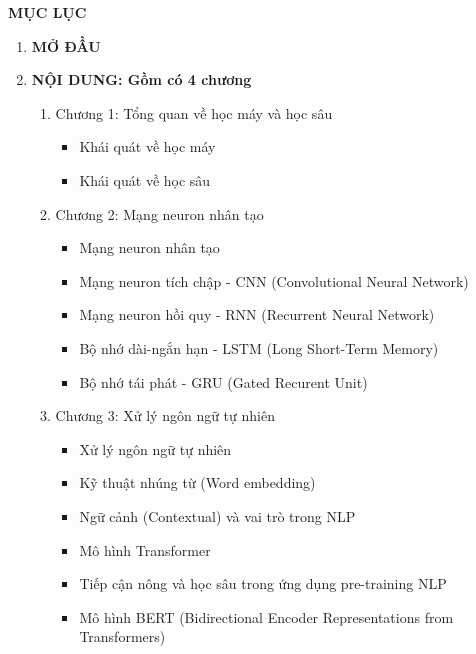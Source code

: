 
\begin{center}
    \textbf{MỤC LỤC}
\end{center}
\begin{enumerate}[label=\textbf{\arabic*.}]
    \item \textbf{MỞ ĐẦU}
    \item \textbf{NỘI DUNG: Gồm có 4 chương}
          \begin{enumerate}
              \item Chương 1: Tổng quan về học máy và học sâu
                    \begin{itemize}
                        \itemsep 0pt
                        \item Khái quát về học máy
                        \item Khái quát về học sâu
                    \end{itemize}
              \item Chương 2: Mạng neuron nhân tạo
                    \begin{itemize}
                        \item Mạng neuron nhân tạo
                        \item Mạng neuron tích chập - CNN (Convolutional Neural Network)
                        \item Mạng neuron hồi quy - RNN (Recurrent Neural Network)
                        \item Bộ nhớ dài-ngắn hạn - LSTM (Long Short-Term Memory)
                        \item Bộ nhớ tái phát - GRU (Gated Recurent Unit)
                    \end{itemize}
              \item Chương 3: Xử lý ngôn ngữ tự nhiên
                    \begin{itemize}
                        \item Xử lý ngôn ngữ tự nhiên
                        \item Kỹ thuật nhúng từ (Word embedding)
                        \item Ngữ cảnh (Contextual) và vai trò trong NLP
                        \item Mô hình Transformer
                        \item Tiếp cận nông và học sâu trong ứng dụng pre-training NLP
                        \item Mô hình BERT (Bidirectional Encoder Representations from Transformers)

\end{itemize}
\end{enumerate}
\end{enumerate}
